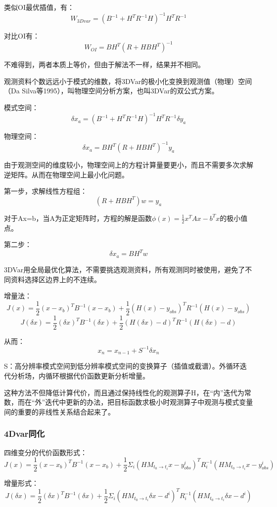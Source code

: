 \documentclass{article}
\begin{document}
类似OI最优插值，有：
$$W_{3Dvar} = (B^{-1} + H^TR^{-1}H)^{-1}H^TR^{-1}$$

对比OI有：
$$W_{OI} = BH^T(R + HBH^T)^{-1}$$

不难得到，两者本质上等价，但由于解法不一样，结果并不相同。

观测资料个数远远小于模式的维数，将3DVar的极小化变换到观测值（物理）空间（Da Silva等1995），叫物理空间分析方案，也叫3DVar的双公式方案。

模式空间：
$$\delta x_a=(B^{-1} + H^TR^{-1}H)^{-1}H^TR^{-1}\delta y_a$$

物理空间：
$$\delta x_a = BH^T(R + HBH^T)^{-1}y_a$$

由于观测空间的维度较小，物理空间上的方程计算量要更小，而且不需要多次求解逆矩阵。从而在物理空间上最小化问题。

第一步，求解线性方程组：
$$(R + HBH^T)w = y_a$$

对于Ax=b，当A为正定矩阵时，方程的解是函数$\phi(x) = \frac{1}{2}x^TAx - b^Tx$的极小值点。

第二步：
$$\delta x_a = BH^T w$$

3DVar用全局最优化算法，不需要挑选观测资料，所有观测同时被使用，避免了不同资料选择区边界上的不连续。

增量法：
$$J(x) = \frac{1}{2}(x-x_b)^{T}B^{-1}(x-x_b) + \frac{1}{2}(H(x)-y_{obs})^{T}R^{-1}(H(x)-y_{obs})$$
$$J(\delta x) = \frac{1}{2}(\delta x)^{T}B^{-1}(\delta x) + \frac{1}{2}(H(\delta x)-d)^{T}R^{-1}(H(\delta x)-d)$$

从而：
$$x_n = x_{n-1} + S^{-1}\delta x_n$$

S：高分辨率模式空间到低分辨率模式空间的变换算子（插值或截谱）。外循环迭代分析场，内循环根据代价函数更新分析增量。

这种方法不但降低计算代价，而且通过保持线性化的观测算子H，在“内”迭代为常数，而在“外”迭代中更新的办法，把目标函数求极小时观测算子中观测与模式变量间的重要的非线性关系结合起来了。

\subsubsection{4Dvar同化}
四维变分的代价函数形式：
$$J(x) = \frac{1}{2}(x-x_b)^{T}B^{-1}(x-x_b) + \frac{1}{2}\Sigma_i(HM_{t_0\longrightarrow t_i}x-y^i_{obs})^{T}R_i^{-1}(HM_{t_0\longrightarrow t_i}x-y^i_{obs})$$

增量形式：
$$J(\delta x) = \frac{1}{2}(\delta x)^{T}B^{-1}(\delta x) + \frac{1}{2}\Sigma_i(HM_{t_0\longrightarrow t_i}\delta x-d^i)^{T}R_i^{-1}(HM_{t_0\longrightarrow t_i}\delta x-d^i)$$
\end{document}

